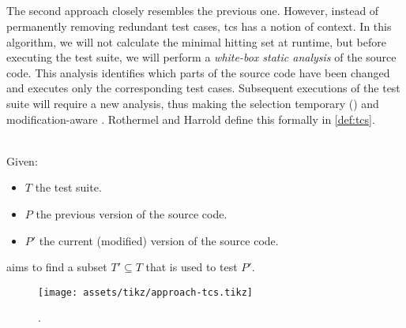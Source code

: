 
\subsection{\tcs{}}
The second approach closely resembles the previous one. However, instead of permanently removing redundant test cases, \acrfull{tcs} has a notion of context. In this algorithm, we will not calculate the minimal hitting set at runtime, but before executing the test suite, we will perform a \emph{white-box static analysis} of the source code. This analysis identifies which parts of the source code have been changed and executes only the corresponding test cases. Subsequent executions of the test suite will require a new analysis, thus making the selection temporary () and modification-aware \cite{10.1002/stv.430}. Rothermel and Harrold define this formally in \cref{def:tcs}.

\begin{definition}[\tcs{}]
\label{def:tcs}
\mbox{}\\Given:
\begin{itemize}
	\item $T$ the test suite.
	\item $P$ the previous version of the source code.
	\item $P'$ the current (modified) version of the source code.
\end{itemize}

\noindent \tcs{} aims to find a subset $T' \subseteq T$ that is used to test $P'$. 
\end{definition}

\begin{figure}[htbp!]
	\centering
	\texttt{[image: assets/tikz/approach-tcs.tikz]}
	\caption{\tcs{}.}
	\label{fig:tcs}
\end{figure}

\clearpage